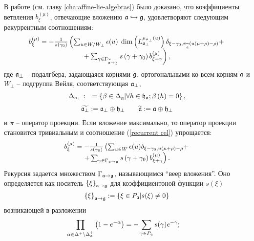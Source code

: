 В работе \cite{2010arXiv1007.0318L} (см. главу \ref{cha:affine-lie-algebras}) было доказано, что коэффициенты ветвления $b_{\xi }^{\left(\mu\right)}$, отвечающие вложению $\mathfrak{a}\hookrightarrow \mathfrak{g}$, удовлетворяют следующим рекуррентным соотношениям:
\begin{equation}
\begin{array}{c}
b_{\xi }^{\left( \mu \right) }=-\frac{1}{s\left( \gamma _{0}\right) }\left(
\sum_{u\in W/W_{\perp}}\epsilon (u)\;\dim \left( L_{\af_{\perp }}^{\mu _{\af%
_{\perp }}\left( u\right) }\right) \delta _{\xi -\gamma _{0},\pi _{%
\widetilde{\af}}(u(\mu +\rho )-\rho )}+\right. \\
\left. +\sum_{\gamma \in \Gamma _{\widetilde{\af}\rightarrow \gf%
}}s\left( \gamma +\gamma _{0}\right) b_{\xi +\gamma }^{\left( \mu \right)
}\right) ,
\end{array}
\label{recurrent rel}
\end{equation}
где $\mathfrak{a}_{\perp}$ -- подалгбера, задающаяся корнями  $\mathfrak{g}$, ортогональными ко всем корням $\mathfrak{a}$ и $W_{\perp}$ -- подгруппа Вейля, соответствующая $\mathfrak{a}_{\perp}$,
\begin{eqnarray}
\Delta _{\mathfrak{a}_{\perp }} &:&=\left\{ \beta \in \Delta _{\mathfrak{g}}|\forall
h\in \frak{h}_{\mathfrak{a}};\beta \left( h\right) =0\right\} ,
\label{delta a ort}
\end{eqnarray}
\begin{eqnarray}
\widetilde{\mathfrak{a}_{\perp }} :=\mathfrak{a}_{\perp }\oplus \frak{h}_{\perp }
\qquad \widetilde{\mathfrak{a}} :=\mathfrak{a}\oplus \frak{h}_{\perp }
\end{eqnarray}
и $\pi$ -- оператор проекции. Если вложение максимально, то оператор проекции становится тривиальным и соотношение (\ref{recurrent rel}) упрощается:
\begin{equation}
\begin{array}{c}
b_{\xi }^{\left( \mu \right) }=-\frac{1}{s\left( \gamma _{0}\right) }\left(
\sum_{u\in W}\epsilon (u) \delta _{\xi -\gamma _{0}, u(\mu +\rho )-\rho
}+\right. \\
\left. +\sum_{\gamma \in \Gamma _{\mathfrak{a}\rightarrow \mathfrak{g}}}s\left(
\gamma +\gamma _{0}\right) b_{\xi +\gamma }^{\left( \mu \right) }\right) .
\end{array}
\label{recurrent relation max}
\end{equation}
Рекурсия задается множеством  $\Gamma _{\mathfrak{a}\rightarrow \mathfrak{g}}$, называющимся ``веер вложения''. Оно определяется как носитель $\left\{ \xi \right\} _{\mathfrak{a}\rightarrow \mathfrak{g}}$ для коэффициентоной функции $s(\xi )$
\[
\left\{ \xi \right\} _{\af\rightarrow \gf}:=\left\{ \xi \in P_{%
\af}|s(\xi )\neq 0\right\}
\]
возникающей в разложении
\begin{equation}
\prod_{\alpha \in \Delta ^{+}\setminus \Delta _{\mathfrak{a}}^{+}}\left( 1-e^{
-\alpha }\right) =-\sum_{\gamma \in P_{\mathfrak{a}}}s(\gamma )e^{-\gamma };\quad
\label{product}
\end{equation}

